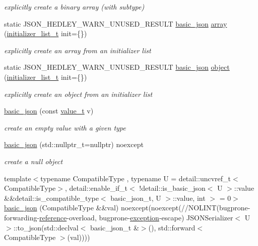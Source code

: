 \begin{DoxyCompactItemize}
\begin{DoxyCompactList}\small\item\em explicitly create a binary array (with subtype) \end{DoxyCompactList}\item 
static J\+S\+O\+N\+\_\+\+H\+E\+D\+L\+E\+Y\+\_\+\+W\+A\+R\+N\+\_\+\+U\+N\+U\+S\+E\+D\+\_\+\+R\+E\+S\+U\+LT \hyperlink{classnlohmann_1_1basic__json}{basic\+\_\+json} \hyperlink{classnlohmann_1_1basic__json_a2c8d8f5741aedadac8f3bffd8f2ce13e}{array} (\hyperlink{classnlohmann_1_1basic__json_ac569f292a070dfd2f6b69c16e746095a}{initializer\+\_\+list\+\_\+t} init=\{\})
\begin{DoxyCompactList}\small\item\em explicitly create an array from an initializer list \end{DoxyCompactList}\item 
static J\+S\+O\+N\+\_\+\+H\+E\+D\+L\+E\+Y\+\_\+\+W\+A\+R\+N\+\_\+\+U\+N\+U\+S\+E\+D\+\_\+\+R\+E\+S\+U\+LT \hyperlink{classnlohmann_1_1basic__json}{basic\+\_\+json} \hyperlink{classnlohmann_1_1basic__json_a9a4df356e05415438fadf8a15e583903}{object} (\hyperlink{classnlohmann_1_1basic__json_ac569f292a070dfd2f6b69c16e746095a}{initializer\+\_\+list\+\_\+t} init=\{\})
\begin{DoxyCompactList}\small\item\em explicitly create an object from an initializer list \end{DoxyCompactList}\item 
\hyperlink{classnlohmann_1_1basic__json_a19734fbc9c97d536832892ddacd6b62a}{basic\+\_\+json} (const \hyperlink{namespacenlohmann_1_1detail_a1ed8fc6239da25abcaf681d30ace4985}{value\+\_\+t} v)
\begin{DoxyCompactList}\small\item\em create an empty value with a given type \end{DoxyCompactList}\item 
\hyperlink{classnlohmann_1_1basic__json_ace6fbaf6c64f60b61922b5c9d3e61aa6}{basic\+\_\+json} (std\+::nullptr\+\_\+t=nullptr) noexcept
\begin{DoxyCompactList}\small\item\em create a null object \end{DoxyCompactList}\item 
{\footnotesize template$<$typename Compatible\+Type , typename U  = detail\+::uncvref\+\_\+t$<$\+Compatible\+Type$>$, detail\+::enable\+\_\+if\+\_\+t$<$ !detail\+::is\+\_\+basic\+\_\+json$<$ U $>$\+::value \&\&detail\+::is\+\_\+compatible\+\_\+type$<$ basic\+\_\+json\+\_\+t, U $>$\+::value, int $>$  = 0$>$ }\\\hyperlink{classnlohmann_1_1basic__json_a232bddcef573bde8777a6a87da0048dd}{basic\+\_\+json} (Compatible\+Type \&\&val) noexcept(noexcept(//N\+O\+L\+I\+NT(bugprone-\/forwarding-\/\hyperlink{classnlohmann_1_1basic__json_a220ae98554a76205fb7f8822d36b2d5a}{reference}-\/overload, bugprone-\/\hyperlink{classnlohmann_1_1detail_1_1exception}{exception}-\/escape) J\+S\+O\+N\+Serializer$<$ U $>$\+::to\+\_\+json(std\+::declval$<$ basic\+\_\+json\+\_\+t \&$>$(), std\+::forward$<$ Compatible\+Type $>$(val))))

\end{DoxyCompactItemize}
